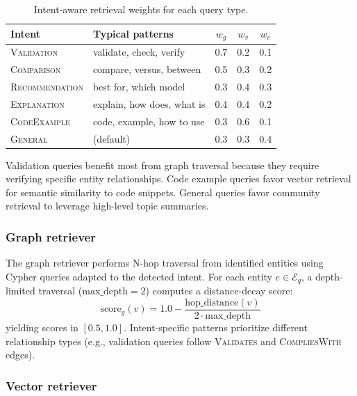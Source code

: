 \documentclass[review]{elsarticle}
\begin{document}
\begin{table}[t]
\caption{Intent-aware retrieval weights for each query type.}
\label{tab:weights}
\centering
\begin{tabular}{@{}llccc@{}}
\toprule
\textbf{Intent} & \textbf{Typical patterns} & $w_g$ & $w_v$ & $w_c$ \\
\midrule
\textsc{Validation} & validate, check, verify & 0.7 & 0.2 & 0.1 \\
\textsc{Comparison} & compare, versus, between & 0.5 & 0.3 & 0.2 \\
\textsc{Recommendation} & best for, which model & 0.3 & 0.4 & 0.3 \\
\textsc{Explanation} & explain, how does, what is & 0.4 & 0.4 & 0.2 \\
\textsc{CodeExample} & code, example, how to use & 0.3 & 0.6 & 0.1 \\
\textsc{General} & (default) & 0.3 & 0.3 & 0.4 \\
\bottomrule
\end{tabular}
\end{table}

Validation queries benefit most from graph traversal because they require verifying specific entity relationships. Code example queries favor vector retrieval for semantic similarity to code snippets. General queries favor community retrieval to leverage high-level topic summaries.

\subsubsection{Graph retriever}

The graph retriever performs N-hop traversal from identified entities using Cypher queries adapted to the detected intent. For each entity $e \in \mathcal{E}_q$, a depth-limited traversal ($\text{max\_depth} = 2$) computes a distance-decay score:
\begin{equation}
\text{score}_g(v) = 1.0 - \frac{\text{hop\_distance}(v)}{2 \cdot \text{max\_depth}}
\label{eq:graph-score}
\end{equation}
yielding scores in $[0.5, 1.0]$. Intent-specific patterns prioritize different relationship types (e.g., validation queries follow \textsc{Validates} and \textsc{CompliesWith} edges).

\subsubsection{Vector retriever}
\end{document}
